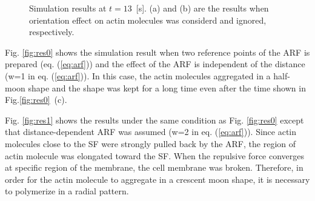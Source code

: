 \documentclass[a4paper,12pt, oneside]{book}
\begin{document}
\begin{figure}[tbp]
 \caption{Simulation results at $t=13$~[s]. (a) and (b) are the results when orientation effect on actin molecules was considerd and ignored, respectively.}
 \label{fig:res5}
\end{figure}
Fig. \ref{fig:res0} shows the simulation result when two reference points of the ARF is prepared (eq. (\ref{eq:arf})) and the effect of the ARF is independent of the distance (w=1 in eq. (\ref{eq:arf})).
In this case, the actin molecules aggregated in a half-moon shape and the shape was kept for a long time even after the time shown in Fig.\ref{fig:res0}~(c).

Fig. \ref{fig:res1} shows the results under the same condition as Fig. \ref{fig:res0} except that distance-dependent ARF was assumed (w=2 in eq. (\ref{eq:arf})).
Since actin molecules close to the SF were strongly pulled back by the ARF, the region of actin molecule was elongated toward the SF.
When the repulsive force converges at specific region of the membrane, the cell membrane was broken.
Therefore, in order for the actin molecule to aggregate in a crescent moon shape, it is necessary to polymerize in a radial pattern.
\end{document}
